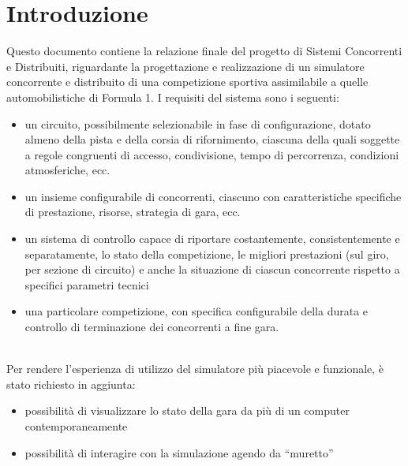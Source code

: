 \chapter{Introduzione} %

\label{Chapter1} %


Questo documento contiene la relazione finale del progetto di Sistemi Concorrenti e Distribuiti, riguardante la progettazione e realizzazione di un simulatore concorrente e distribuito di una competizione sportiva assimilabile a quelle automobilistiche di Formula 1.
I requisiti del sistema sono i seguenti:
\begin{itemize}
 \item un circuito, possibilmente selezionabile in fase di configurazione, dotato almeno della pista e della corsia di rifornimento, ciascuna della quali soggette a regole congruenti di accesso, condivisione, tempo di percorrenza, condizioni atmosferiche, ecc.
 \item un insieme configurabile di concorrenti, ciascuno con caratteristiche specifiche di prestazione, risorse, strategia di gara, ecc.
 \item un sistema di controllo capace di riportare costantemente, consistentemente e separatamente, lo stato della competizione, le migliori prestazioni (sul giro, per sezione di circuito) e anche la situazione di ciascun concorrente rispetto a specifici parametri tecnici
 \item una particolare competizione, con specifica configurabile della durata e controllo di terminazione dei concorrenti a fine gara.
\end{itemize}
\\
Per rendere l'esperienza di utilizzo del simulatore più piacevole e funzionale, è stato richiesto in aggiunta:
\begin{itemize}
\item possibilità di visualizzare lo stato della gara da più di un computer contemporaneamente
\item possibilità di interagire con la simulazione agendo da “muretto”
\end{itemize}
